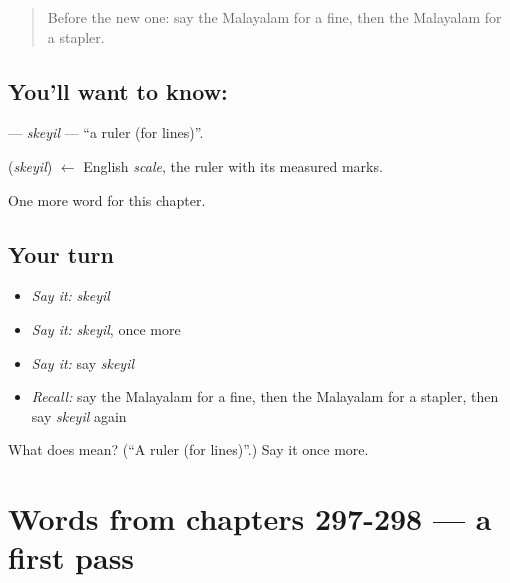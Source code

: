 \label{lesson:ML-C301-skeyil}



\begin{quote}
Before the new one: say the Malayalam for a fine, then the Malayalam for a stapler.
\end{quote}

\subsection*{You'll want to know: }
\textbf{} — \emph{skeyil} — \textquotedblleft{}a ruler (for lines)\textquotedblright{}.

\begin{cousinweb}
\textbf{} (\emph{skeyil}) $\leftarrow$ English \emph{scale}, the ruler with its measured marks.
\end{cousinweb}

\begin{grammarlens}[title={What you've built}]
One more word for this chapter.
\end{grammarlens}

\subsection*{Your turn}
\begin{itemize}
\raggedright
  \item \emph{Say it:} \emph{skeyil}
  \item \emph{Say it:} \emph{skeyil}, once more
  \item \emph{Say it:} say \emph{skeyil}
  \item \emph{Recall:} say the Malayalam for a fine, then the Malayalam for a stapler, then say \emph{skeyil} again
\end{itemize}

\begin{tcolorbox}[breakable,colback=teal!4,colframe=teal!35!black,title={Before you move on}]
What does  mean? (\textquotedblleft{}A ruler (for lines)\textquotedblright{}.) Say it once more.
\end{tcolorbox}
\section[(dialogue)]{Words from chapters 297-298 — a first pass}

\label{lesson:ML-R301-first-pass-words-from-chapters-297-298}



